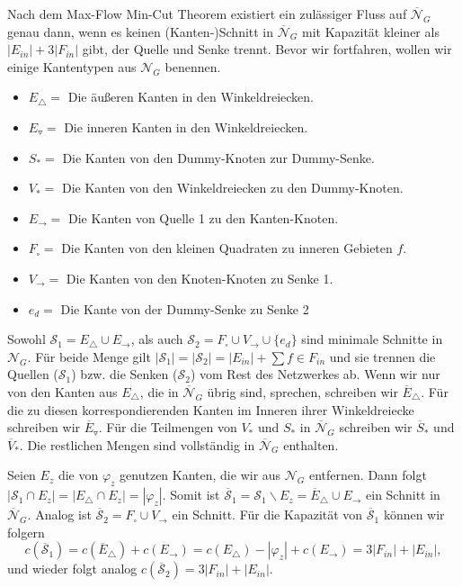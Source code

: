 Nach dem Max-Flow Min-Cut Theorem existiert ein zulässiger Fluss auf $\overline{\mathcal{N}}_G$ genau dann, wenn es keinen (Kanten-)Schnitt in $\overline{\mathcal{N}}_G$ mit Kapazität kleiner als $|E_{in}| + 3|F_{in}|$ gibt, der Quelle und Senke trennt. Bevor wir fortfahren, wollen wir einige Kantentypen aus $\mathcal{N}_G$ benennen.

\begin{itemize}
\item $E_\triangle = $ Die äußeren Kanten in den Winkeldreiecken.
\item $E_\triangledown = $ Die inneren Kanten in den Winkeldreiecken.
\item $S_* =$ Die Kanten von den Dummy-Knoten zur Dummy-Senke.
\item $V_* = $ Die Kanten von den Winkeldreiecken zu den Dummy-Knoten.
\item $E_{\to} = $ Die Kanten von Quelle 1 zu den Kanten-Knoten.
\item $F_\square = $ Die Kanten von den kleinen Quadraten zu inneren Gebieten $f$.
\item $V_{\to} = $ Die Kanten von den Knoten-Knoten zu Senke 1.
\item $e_{d} = $ Die Kante von der Dummy-Senke zu Senke 2
\end{itemize}

Sowohl $\mathcal{S}_1 = E_\triangle \cup E_{\to}$, als auch $\mathcal{S}_2 = F_\square \cup V_{\to} \cup \{e_{d}\}$ sind minimale Schnitte in $\mathcal{N}_G$. Für beide Menge gilt $|\mathcal{S}_1| = |\mathcal{S}_2| = |E_{in}| + \sum{f \in F_{in}}$ und sie trennen die Quellen ($\mathcal{S}_1$) bzw. die Senken ($\mathcal{S}_2$) vom Rest des Netzwerkes ab. Wenn wir nur von den Kanten aus $E_\triangle$, die in $\overline{\mathcal{N}}_G$ übrig sind, sprechen, schreiben wir $\overline{E}_\triangle$. Für die zu diesen korrespondierenden Kanten im Inneren ihrer Winkeldreiecke schreiben wir $\overline{E}_\triangledown$. Für die Teilmengen von $V_*$ und $S_*$ in $\overline{\mathcal{N}}_G$ schreiben wir $\overline{S}_*$ und $\overline{V}_*$. Die restlichen Mengen sind vollständig in $\overline{\mathcal{N}}_G$ enthalten.

Seien $E_z$ die von $\varphi_z$ genutzen Kanten, die wir aus $\mathcal{N}_G$ entfernen. Dann folgt $|\mathcal{S}_1 \cap E_z| = |E_\triangle \cap E_z| = |\varphi_z|$. Somit ist $\overline{\mathcal{S}}_1 = \mathcal{S}_1 \backslash E_z = \overline{E}_\triangle \cup E_\to$ ein Schnitt in $\overline{\mathcal{N}}_G$. Analog ist $\overline{\mathcal{S}}_2 = F_\square \cup V_{\to}$ ein Schnitt. Für die Kapazität von $\overline{\mathcal{S}}_1$ können wir folgern 
$$ c(\overline{\mathcal{S}}_1) = c(\overline{E}_\triangle) + c(E_\to) = c(E_\triangle) - |\varphi_z| + c(E_\to) = 3|F_{in}| + |E_{in}|,$$
und wieder folgt analog $c(\overline{\mathcal{S}}_2) = 3|F_{in}| + |E_{in}|$.


